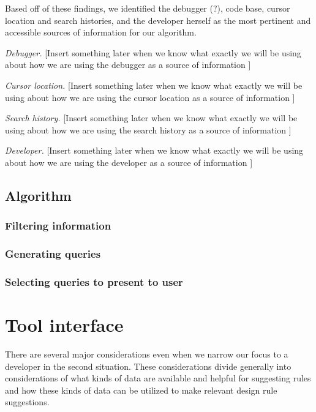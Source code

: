 \documentclass[12pt]{article}
\begin{document}
Based off of  these findings, we identified the debugger (?), code base, cursor location and search histories, and the developer herself as the most pertinent and accessible sources of information for our algorithm.

\textit{Debugger.} [Insert something later when we know what exactly we will be using about how we are using the debugger as a source of information ]

\textit{Cursor location.} [Insert something later when we know what exactly we will be using about how we are using the cursor location as a source of information ]

\textit{Search history.} [Insert something later when we know what exactly we will be using about how we are using the search history as a source of information ]

\textit{Developer.} [Insert something later when we know what exactly we will be using about how we are using the developer as a source of information ]



\subsection{Algorithm} \label{algm}

\subsubsection{Filtering information}
\subsubsection{Generating queries}
\subsubsection{Selecting queries to present to user}

\clearpage


\section{Tool interface} \label{toolInterface}
There are several major considerations even when we narrow our focus to a developer in the second situation. These considerations divide generally into considerations of what kinds of data are available and helpful for suggesting rules and how these kinds of data can be utilized to make relevant design rule suggestions.
\end{document}
